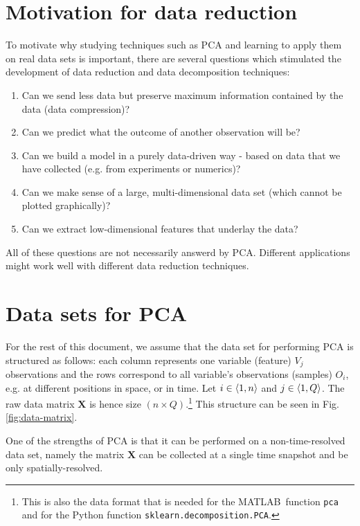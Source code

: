 \documentclass[10pt,twocolumn]{article}
\begin{document}
\section{Motivation for data reduction}

To motivate why studying techniques such as PCA and learning to apply them on real data sets is important, there are several questions which stimulated the development of data reduction and data decomposition techniques:

\begin{enumerate}
\item Can we send less data but preserve maximum information contained by the data (data compression)?

\item Can we predict what the outcome of another observation will be?

\item Can we build a model in a purely data-driven way - based on data that we have collected (e.g. from experiments or numerics)?

\item Can we make sense of a large, multi-dimensional data set (which cannot be plotted graphically)?

\item Can we extract low-dimensional features that underlay the data?
\end{enumerate}

All of these questions are not necessarily answerd by PCA. Different applications might work well with different data reduction techniques.

\section{Data sets for PCA}

For the rest of this document, we assume that the data set for performing PCA is structured as follows: each column represents one variable (feature) $V_j$ observations and the rows correspond to all variable's observations (samples) $O_i$, e.g. at different positions in space, or in time. Let $i \in \braket{1, n}$ and $j \in \braket{1, Q}$. The raw data matrix $\bm{X}$ is hence size $(n \times Q)$.\footnote{This is also the data format that is needed for the MATLAB\textregistered \, function \texttt{pca} and for the Python function \texttt{sklearn.decomposition.PCA}.} This structure can be seen in Fig.\ref{fig:data-matrix}.

One of the strengths of PCA is that it can be performed on a non-time-resolved data set, namely the matrix $\bm{X}$ can be collected at a single time snapshot and be only spatially-resolved.
\end{document}
